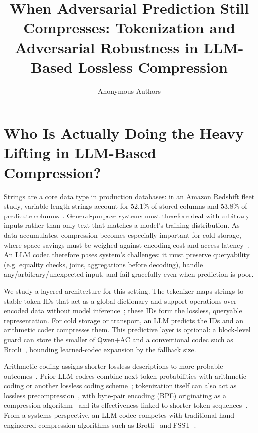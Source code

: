 \documentclass{article}
\title{When Adversarial Prediction Still Compresses: Tokenization and Adversarial Robustness in LLM-Based Lossless Compression}
\author{Anonymous Authors}
\begin{document}
\maketitle



\section{Who Is Actually Doing the Heavy Lifting in LLM-Based Compression?}

Strings are a core data type in production databases: in an Amazon Redshift
fleet study, variable-length strings account for 52.1\% of stored columns and
53.8\% of predicate columns~\citep{vanrenen2024tpc}. General-purpose systems
must therefore deal with arbitrary inputs rather than only text that matches a
model's training distribution. As data accumulates, compression becomes
especially important for cold storage, where space savings must be weighed
against encoding cost and access latency~\citep{kipf2026waiting}. An LLM
codec therefore poses system's challenges: it must preserve queryability (e.g. equality checks, joins, aggregations before decoding), handle
any/arbitrary/unexpected input, and fail gracefully even when prediction is poor.

We study a layered architecture for this setting. The tokenizer maps strings to
stable token IDs that act as a global dictionary and support operations over
encoded data without model inference~\citep{schmidt2026accelerating}; these IDs
form the lossless, queryable representation. For cold storage or transport, an
LLM predicts the IDs and an arithmetic coder compresses them. This predictive
layer is optional: a block-level guard can store the smaller of Qwen+AC and a
conventional codec such as Brotli~\citep{alakuijala2016brotli}, bounding learned-codec expansion by the
fallback size.

Arithmetic coding assigns shorter lossless descriptions to more probable
outcomes~\citep{witten1987arithmetic,steinruecken2015lossless}. Prior LLM codecs combine next-token
probabilities with arithmetic coding or another lossless coding scheme~\citep{valmeekam2023llmzip}; tokenization itself can also
act as lossless precompression~\citep{deletang2024language}, with byte-pair
encoding (BPE) originating as a compression algorithm~\citep{gage1994new} and
its effectiveness linked to shorter token sequences~\citep{galle2019investigating}.
From a systems perspective, an LLM codec competes with traditional hand-engineered
compression algorithms such as Brotli~\citep{alakuijala2016brotli} and FSST~\citep{boncz2020fsst}.
\end{document}
